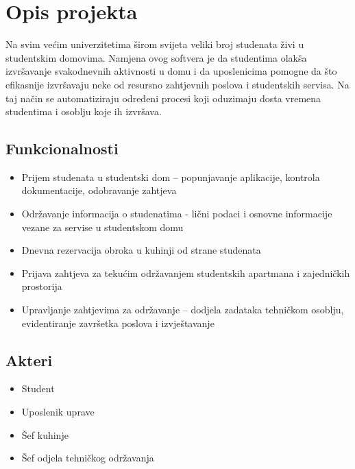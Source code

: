 \documentclass{article}
\begin{document}
\renewcommand{\contentsname}{Sadržaj}
\tableofcontents

\newpage

\section{Opis projekta}
\hspace{\indent}Na svim većim univerzitetima širom svijeta veliki broj studenata živi u studentskim domovima. Namjena ovog softvera je da studentima olakša izvršavanje svakodnevnih aktivnosti u domu i da uposlenicima pomogne da što efikasnije izvršavaju neke od resursno zahtjevnih poslova i studentskih servisa. Na taj način se automatiziraju određeni procesi koji oduzimaju dosta vremena studentima i osoblju koje ih izvršava.

\subsection*{Funkcionalnosti}
\begin{itemize}
  \item Prijem studenata u studentski dom – popunjavanje aplikacije, kontrola dokumentacije, odobravanje zahtjeva
  \item Održavanje informacija o studenatima - lični podaci i osnovne informacije vezane za servise u studentskom domu
  \item Dnevna rezervacija obroka u kuhinji od strane studenata
  \item Prijava zahtjeva za tekućim održavanjem studentskih apartmana i zajedničkih prostorija
  \item Upravljanje zahtjevima za održavanje – dodjela zadataka tehničkom osoblju, evidentiranje završetka poslova i izvještavanje
  
\end{itemize}

\subsection*{Akteri}
\begin{itemize}
    \item Student
    \item Uposlenik uprave
    \item Šef kuhinje
    \item Šef odjela tehničkog održavanja
\end{itemize}
\end{document}
